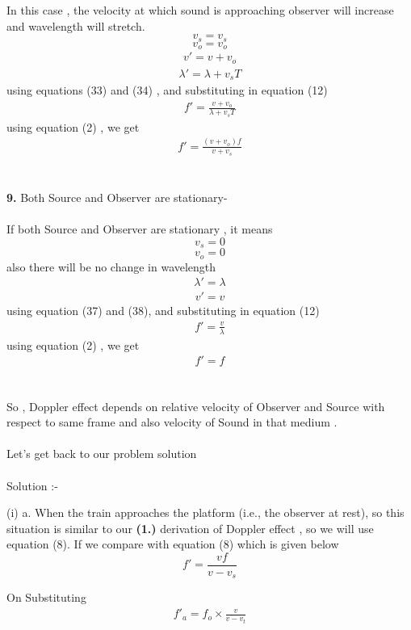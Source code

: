 \documentclass[journal,12pt,twocolumn]{IEEEtran}
\theoremstyle{remark}
\begin{document}
In this case , the velocity at which sound is approaching observer will increase and wavelength will stretch.
$$v_s = v_s$$
$$v_o = v_o$$
\begin{align}v'= v+v_o\end{align}
\begin{align}\lambda' = \lambda + v_s T\end{align}
using equations (33) and (34) , and substituting in equation (12) 
\begin{align}f' = \frac{v+v_o}{\lambda+v_s T}\end{align}
using equation (2) , we get 
\begin{align}f' = \frac{(v+v_o) f}{v +v_s}\end{align}\\\\
\textbf{9.} Both Source and Observer are stationary-\\\\
If both Source and Observer are stationary , it means 
$$v_s = 0$$
$$v_o = 0$$
also there will be no change in wavelength 
\begin{align}\lambda' = \lambda\end{align}
\begin{align}v'= v\end{align}
using equation (37) and (38), and substituting in equation (12) 
\begin{align}f' = \frac{v}{\lambda}\end{align}
using equation (2) , we get 
\begin{align}f' = f\end{align}\\\\

So , Doppler effect depends on relative velocity of Observer and Source with respect to same frame and also velocity of Sound in that medium .\\\\
Let's get back to our problem solution\\\\
Solution :-\\
         \begin{table}[h]
        
    \end{table}

(i)  a. When the train approaches the platform (i.e., the observer at rest), so this situation is similar to our \textbf{(1.)} derivation of Doppler effect , so we will use equation (8). If we compare with equation (8) which is given below
$$f' = \frac{v f}{v- v_s }$$
 \begin{table}[h]
        
    \end{table}
On Substituting
\begin{align}f'_a=f_o\times\frac{v}{v-v_t}\end{align}
\end{document}

